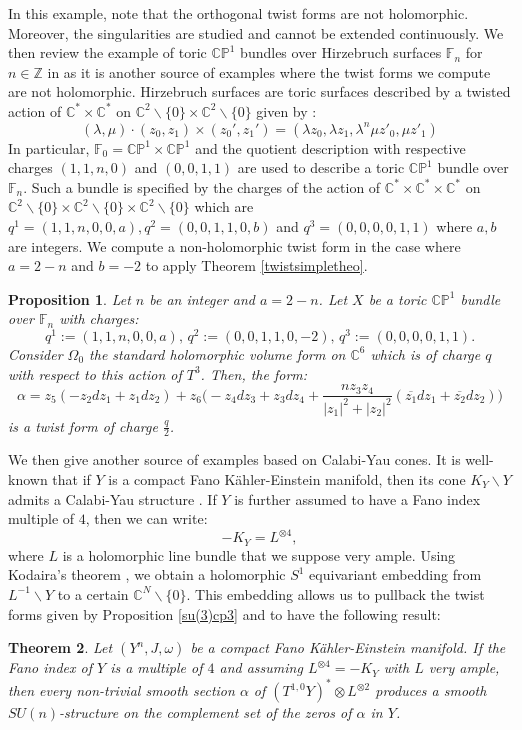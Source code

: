 \documentclass[12pt, reqno]{amsart}
\newtheorem{introthm}{Theorem}
\newtheorem{introprop}[introthm]{Proposition}
\newcommand{\C}{\mathbb{C}}
\newcommand{\p}{\mathbb{P}}
\newcommand{\Z}{\mathbb{Z}}
\newcommand{\F}{\mathbb{F}}
\begin{document}
In this example, note that the orthogonal twist forms are not holomorphic. Moreover, the singularities are studied and cannot be extended continuously. 
\indent We then review the example of toric $\C\p^1$ bundles over Hirzebruch surfaces $\F_n$ for $n\in\Z$ in \cite{Larfors_2010} as it is another source of examples where the twist forms we compute are not holomorphic. Hirzebruch surfaces are toric surfaces described by a twisted action of $\C^*\times\C^*$ on $\C^2\backslash\{0\}\times\C^2\backslash\{0\}$ given by : \[(\lambda,\mu)\cdot(z_0,z_1)\times(z_0',z_1')=(\lambda z_0,\lambda z_1,\lambda^n\mu z'_0,\mu z'_1)\] In particular, $\F_0=\C\p^1\times\C\p^1$ and the quotient description with respective charges $(1,1,n,0)$ and $(0,0,1,1)$ are used to describe a toric $\C\p^1$ bundle over $\F_n$. Such a bundle is specified by the charges of the action of $\C^*\times\C^*\times\C^*$ on $\C^2\backslash\{0\}\times\C^2\backslash\{0\}\times\C^2\backslash\{0\}$ which are $q^1=(1,1,n,0,0,a), q^2=(0,0,1,1,0,b)$ and $q^3=(0,0,0,0,1,1)$ where $a,b$ are integers. We compute a non-holomorphic twist form in the case where $a=2-n$ and $b=-2$ to apply Theorem \ref{twistsimpletheo}. 
\begin{introprop}
    Let $n$ be an integer and $a=2-n$. Let $X$ be a toric $\C\p^1$ bundle over $\F_n$ with charges:
    \[q^1:=(1,1,n,0,0,a),\, q^2:=(0,0,1,1,0,-2),\, q^3:=(0,0,0,0,1,1).\] Consider $\Omega_0$ the standard holomorphic volume form on $\C^6$ which is of charge $q$ with respect to this action of $T^3$. Then, the form: \[\alpha=z_5(-z_2dz_1+z_1dz_2)+z_6\bigg(-z_4dz_3+z_3dz_4+\frac{nz_3z_4}{|z_1|^2+|z_2|^2}(\overline{z_1}dz_1+\overline{z_2}dz_2)\bigg)\] is a twist form of charge $\frac{q}{2}$. 
\end{introprop}
We then give another source of examples based on Calabi-Yau cones. It is well-known that if $Y$ is a compact Fano Kähler-Einstein manifold, then its cone $K_Y\backslash Y$ admits a Calabi-Yau structure \cite{sparks2010sasakieinsteinmanifolds}. If $Y$ is further assumed to have a Fano index multiple of $4$, then we can write:\[-K_Y=L^{\otimes 4},\] where $L$ is a holomorphic line bundle that we suppose very ample. Using Kodaira's theorem \cite{Wells1980}, we obtain a holomorphic $S^1$ equivariant embedding from $L^{-1}\backslash Y$ to a certain $\C^N\backslash\{0\}$. This embedding allows us to pullback the twist forms given by Proposition \ref{su(3)cp3} and to have the following result:
\begin{introthm}\label{cones}
    Let $(Y^n,J,\omega)$ be a compact Fano Kähler-Einstein manifold. If the Fano index of $Y$ is a multiple of $4$ and assuming $L^{\otimes 4}=-K_Y$ with $L$ very ample, then every non-trivial smooth section $\alpha$ of $(T^{1,0}Y)^*\otimes L^{\otimes 2}$ produces a smooth $SU(n)$-structure on the complement set of the zeros of $\alpha$ in $Y$.
\end{introthm}
\end{document}

